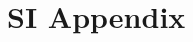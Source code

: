 \documentclass{article}
\theoremstyle{definition}
\theoremstyle{remark}
\begin{document}
\clearpage
\setcounter{figure}{0}
\setcounter{table}{0}
\setcounter{equation}{0}
\renewcommand{\thefigure}{S\arabic{figure}}
\renewcommand{\thetable}{S\arabic{table}}
\renewcommand{\theequation}{S\arabic{equation}}
\setcounter{section}{0}
\renewcommand{\thesection}{S\arabic{section}}

\section*{SI Appendix}

\end{document}
